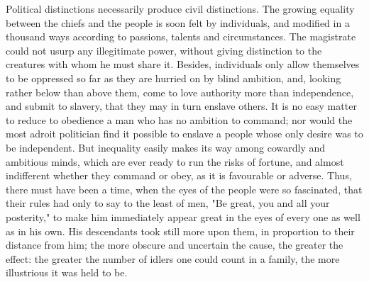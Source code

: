 \documentclass[12pt]{report}
\begin{document}
Political distinctions necessarily produce civil distinctions. The growing equality between the chiefs and the people is soon felt by individuals, and modified in a thousand ways according to passions, talents and circumstances. The magistrate could not usurp any illegitimate power, without giving distinction to the creatures with whom he must share it. Besides, individuals only allow themselves to be oppressed so far as they are hurried on by blind ambition, and, looking rather below than above them, come to love authority more than independence, and submit to slavery, that they may in turn enslave others. It is no easy matter to reduce to obedience a man who has no ambition to command; nor would the most adroit politician find it possible to enslave a people whose only desire was to be independent. But inequality easily makes its way among cowardly and ambitious minds, which are ever ready to run the risks of fortune, and almost indifferent whether they command or obey, as it is favourable or adverse. Thus, there must have been a time, when the eyes of the people were so fascinated, that their rules had only to say to the least of men, "Be great, you and all your posterity," to make him immediately appear great in the eyes of every one as well as in his own. His descendants took still more upon them, in proportion to their distance from him; the more obscure and uncertain the cause, the greater the effect: the greater the number of idlers one could count in a family, the more illustrious it was held to be.
\end{document}
